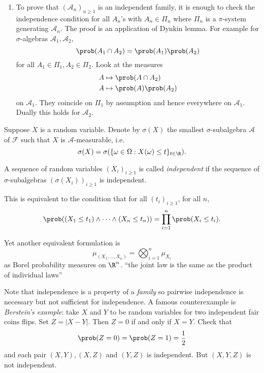 \documentclass[a4paper]{article}
\renewcommand{\P}{\prob} %
\begin{document}
\begin{remark}\leavevmode
  \begin{enumerate}
  \item To prove that \((\mathcal A_n)_{n \geq 1}\) is an independent family, it is enough to check the independence condition for all \(A_n\)'s with \(A_n \in \Pi_n\) where \(\Pi_n\) is a \(\pi\)-system generating \(\mathcal A_n\). The proof is an application of Dynkin lemma. For example for \(\sigma\)-algebras \(\mathcal A_1, \mathcal A_2\),
    \[
      \P(A_1 \cap A_2) = \P(A_1) \P(A_2)
    \]
    for all \(A_1 \in \Pi_1, A_2 \in \Pi_2\). Look at the measures
    \begin{align*}
      A &\mapsto \P(A \cap A_2) \\
      A &\mapsto \P(A) \P(A_2)
    \end{align*}
    on \(\mathcal A_1\). They coincide on \(\Pi_1\) by assumption and hence everywhere on \(\mathcal A_1\). Dually this holds for \(\mathcal A_2\).
  \end{enumerate}
\end{remark}

\begin{notation}
  Suppose \(X\) is a random variable. Denote by \(\sigma(X)\) the smallest \(\sigma\)-subalgebra \(\mathcal A\) of \(\mathcal F\) such that \(X\) is \(\mathcal A\)-measurable, i.e.
  \[
    \sigma(X) = \sigma(\{\omega \in \Omega: X(\omega) \leq t\}_{t \in \R}).
  \]
\end{notation}

\begin{definition}[independence]
  A sequence of random variables \((X_i)_{i \geq 1}\) is called \emph{independent} if the sequence of \(\sigma\)-subalgebras \((\sigma(X_i))_{i \geq 1}\) is independent.
\end{definition}

\begin{remark}
  This is equivalent to the condition that for all \((t_i)_{i \geq 1}\), for all \(n\),
  \[
    \P((X_1 \leq t_1) \wedge \dots \wedge (X_n \leq t_n)) = \prod_{i = 1}^n \P(X_i \leq t_i).
  \]

  Yet another equivalent formulation is
  \[
    \mu_{(X_1, \dots, X_n)} = \bigotimes_{i = 1}^n \mu_{X_i}
  \]
  as Borel probability measures on \(\R^n\). ``the joint law is the same as the product of individual laws''
\end{remark}

\begin{note}
  Note that independence is a property of a \emph{family} so pairwise independence is necessary but not sufficient for independence. A famous counterexample is \emph{Berstein's example}: take \(X\) and \(Y\) to be random variables for two independent fair coins flips. Set \(Z = |X - Y|\). Then \(Z = 0\) if and only if \(X = Y\). Check that
  \[
    \P(Z = 0) = \P(Z = 1) = \frac{1}{2}
  \]
  and each pair \((X, Y), (X, Z)\) and \((Y, Z)\) is independent. But \((X, Y, Z)\) is not independent.
\end{note}
\end{document}
